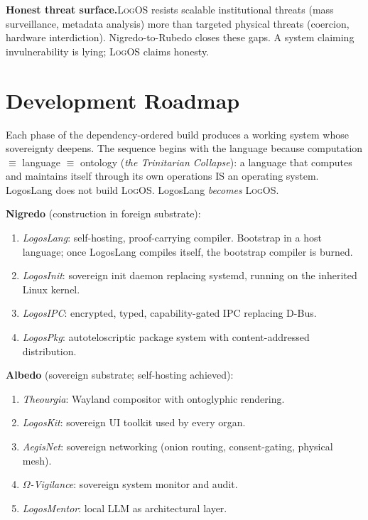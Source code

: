 \documentclass[11pt, oneside]{article}
\newcommand{\LogOS}{\textnormal{\textsc{LogOS}}}
\begin{document}
\medskip
\noindent\textbf{Honest threat surface.}\quad \LogOS{} resists scalable
institutional threats (mass surveillance, metadata analysis) more than
targeted physical threats (coercion, hardware interdiction).
Nigredo-to-Rubedo closes these gaps. A system claiming
invulnerability is lying; \LogOS{} claims honesty.

\section{Development Roadmap}

Each phase of the dependency-ordered build produces a working system
whose sovereignty deepens. The sequence begins with the language because
computation $\equiv$ language $\equiv$ ontology (\textit{the Trinitarian
Collapse}): a language that computes and maintains itself through its own
operations IS an operating system. LogosLang does not build \LogOS{}.
LogosLang \textit{becomes} \LogOS{}.

\medskip
\noindent\textbf{Nigredo} (construction in foreign substrate):
\begin{enumerate}[label=\arabic*., noitemsep, leftmargin=2.2em]
\item \textit{LogosLang}: self-hosting, proof-carrying compiler.
      Bootstrap in a host language; once LogosLang compiles itself, the
      bootstrap compiler is burned.
\item \textit{LogosInit}: sovereign init daemon replacing systemd,
      running on the inherited Linux kernel.
\item \textit{LogosIPC}: encrypted, typed, capability-gated IPC
      replacing D-Bus.
\item \textit{LogosPkg}: autoteloscriptic package system with
      content-addressed distribution.
\end{enumerate}

\medskip
\noindent\textbf{Albedo} (sovereign substrate; self-hosting achieved):
\begin{enumerate}[label=\arabic*., noitemsep, leftmargin=2.2em, start=5]
\item \textit{Theourgia}: Wayland compositor with ontoglyphic rendering.
\item \textit{LogosKit}: sovereign UI toolkit used by every organ.
\item \textit{AegisNet}: sovereign networking (onion routing,
      consent-gating, physical mesh).
\item \textit{$\Omega$-Vigilance}: sovereign system monitor and audit.
\item \textit{LogosMentor}: local LLM as architectural layer.
\end{enumerate}
\end{document}
